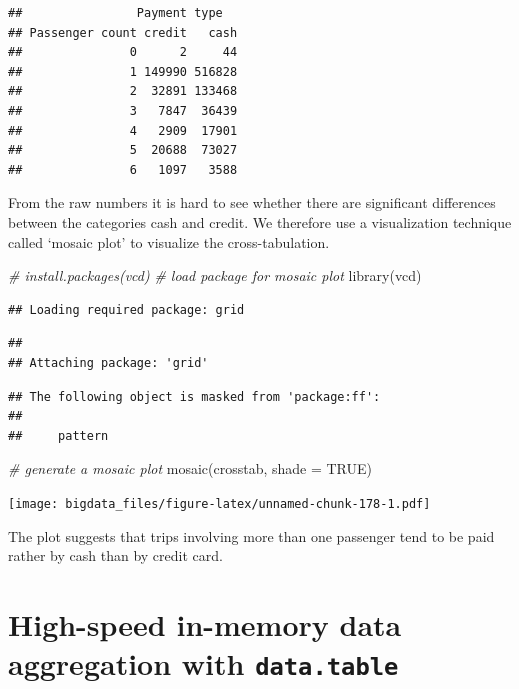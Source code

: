 \documentclass[
  12pt,
]{style/krantz}
\newenvironment{Shaded}{\begin{snugshade}}{\end{snugshade}}
\newcommand{\AttributeTok}[1]{\textcolor[rgb]{0.77,0.63,0.00}{#1}}
\newcommand{\CommentTok}[1]{\textcolor[rgb]{0.56,0.35,0.01}{\textit{#1}}}
\newcommand{\ConstantTok}[1]{\textcolor[rgb]{0.00,0.00,0.00}{#1}}
\newcommand{\FunctionTok}[1]{\textcolor[rgb]{0.00,0.00,0.00}{#1}}
\newcommand{\NormalTok}[1]{#1}
\begin{document}
\begin{verbatim}
##                Payment type
## Passenger count credit   cash
##               0      2     44
##               1 149990 516828
##               2  32891 133468
##               3   7847  36439
##               4   2909  17901
##               5  20688  73027
##               6   1097   3588
\end{verbatim}

From the raw numbers it is hard to see whether there are significant differences between the categories cash and credit. We therefore use a visualization technique called `mosaic plot' to visualize the cross-tabulation.

\begin{Shaded}
\begin{Highlighting}[]
\CommentTok{\# install.packages(vcd)}
\CommentTok{\# load package for mosaic plot}
\FunctionTok{library}\NormalTok{(vcd)}
\end{Highlighting}
\end{Shaded}

\begin{verbatim}
## Loading required package: grid
\end{verbatim}

\begin{verbatim}
## 
## Attaching package: 'grid'
\end{verbatim}

\begin{verbatim}
## The following object is masked from 'package:ff':
## 
##     pattern
\end{verbatim}

\begin{Shaded}
\begin{Highlighting}[]
\CommentTok{\# generate a mosaic plot}
\FunctionTok{mosaic}\NormalTok{(crosstab, }\AttributeTok{shade =} \ConstantTok{TRUE}\NormalTok{)}
\end{Highlighting}
\end{Shaded}

\texttt{[image: bigdata\_files/figure-latex/unnamed-chunk-178-1.pdf]}

The plot suggests that trips involving more than one passenger tend to be paid rather by cash than by credit card.

\hypertarget{high-speed-in-memory-data-aggregation-with-data.table}{%
\section{\texorpdfstring{High-speed in-memory data aggregation with \texttt{data.table}}{High-speed in-memory data aggregation with data.table}}\label{high-speed-in-memory-data-aggregation-with-data.table}}
\end{document}
